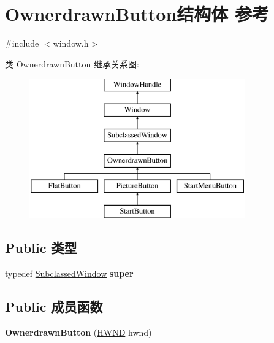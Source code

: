 \hypertarget{struct_ownerdrawn_button}{}\section{Ownerdrawn\+Button结构体 参考}
\label{struct_ownerdrawn_button}


{\ttfamily \#include $<$window.\+h$>$}

类 Ownerdrawn\+Button 继承关系图\+:\begin{figure}[H]
\begin{center}
\leavevmode
\includegraphics[height=6.000000cm]{struct_ownerdrawn_button}
\end{center}
\end{figure}
\subsection*{Public 类型}
\begin{DoxyCompactItemize}
\item 
\mbox{\label{struct_ownerdrawn_button_abf6500b5ada88584590af397a2c3fcfb}} 
typedef \hyperlink{struct_subclassed_window}{Subclassed\+Window} {\bfseries super}
\end{DoxyCompactItemize}
\subsection*{Public 成员函数}
\begin{DoxyCompactItemize}
\item 
\mbox{\label{struct_ownerdrawn_button_aa3722a706daa324b9352fa7ec268cfb0}} 
{\bfseries Ownerdrawn\+Button} (\hyperlink{interfacevoid}{H\+W\+ND} hwnd)
\end{DoxyCompactItemize}
